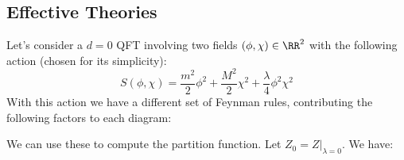 \documentclass{jknotes}
\begin{document}
\subsection{Effective Theories}
Let's consider a \(d=0\) QFT involving two fields \((\phi,\chi)\in\RR^2\) with the following action (chosen for its simplicity):
\begin{equation}
    S(\phi,\chi) = \frac{m^2}{2}\phi^2 + \frac{M^2}{2}\chi^2 + \frac{\lambda}{4}\phi^2\chi^2
\end{equation}
With this action we have a different set of Feynman rules, contributing the following factors to each diagram:
\begin{figure}[H]
    \centering
\end{figure}
We can use these to compute the partition function. Let \(Z_0 = Z|_{\lambda=0}\). We have:
\end{document}
